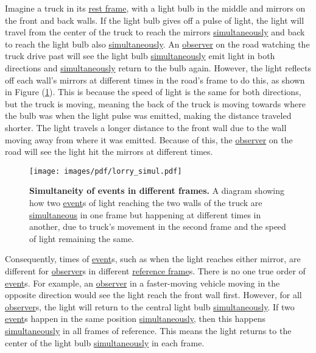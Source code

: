 Imagine a truck in its \hyperlink{def-proper-frame}{rest frame}, with a light bulb in the middle and mirrors on the front and back walls.
If the light bulb gives off a pulse of light, the light will travel from the center of the truck to reach the mirrors \hyperlink{def-simultaneity}{simultaneously} and back to reach the light bulb also \hyperlink{def-simultaneity}{simultaneously}.
An \hyperlink{def-observer}{observer} on the road watching the truck drive past will see the light bulb \hyperlink{def-simultaneity}{simultaneously} emit light in both directions and \hyperlink{def-simultaneity}{simultaneously} return to the bulb again.
However, the light reflects off each wall's mirrors at different times in the road's frame to do this, as shown in Figure (\ref{fig: truck simultaneity}).
This is because the speed of light is the same for both directions, but the truck is moving, meaning the back of the truck is moving towards where the bulb was when the light pulse was emitted, making the distance traveled shorter.
The light travels a longer distance to the front wall due to the wall moving away from where it was emitted.
Because of this, the \hyperlink{def-observer}{observer} on the road will see the light hit the mirrors at different times.

\begin{figure}[htbp]
	\centering
	\texttt{[image: images/pdf/lorry\_simul.pdf]}
	\caption{\textbf{Simultaneity of events in different frames.} A diagram showing how two \protect\hyperlink{def-event}{event}s of light reaching the two walls of the truck are \protect\hyperlink{def-simultaneity}{simultaneous} in one frame but happening at different times in another, due to truck's movement in the second frame and the speed of light remaining the same.}
	\label{fig: truck simultaneity}
\end{figure}

\iffalse javascript{createTruckDiagram: 2 } %
\fi%

Consequently, times of \hyperlink{def-event}{event}s, such as when the light reaches either mirror, are different for \hyperlink{def-observer}{observer}s in different \hyperlink{def-Reference-frame}{reference frame}s.
There is no one true order of \hyperlink{def-event}{event}s.
For example, an \hyperlink{def-observer}{observer} in a faster-moving vehicle moving in the opposite direction would see the light reach the front wall first.
However, for all \hyperlink{def-observer}{observer}s, the light will return to the central light bulb \hyperlink{def-simultaneity}{simultaneously}.
If two \hyperlink{def-event}{event}s happen in the same position \hyperlink{def-simultaneity}{simultaneously}, then this happens \hyperlink{def-simultaneity}{simultaneously} in all frames of reference.
This means the light returns to the center of the light bulb \hyperlink{def-simultaneity}{simultaneously} in each frame.

